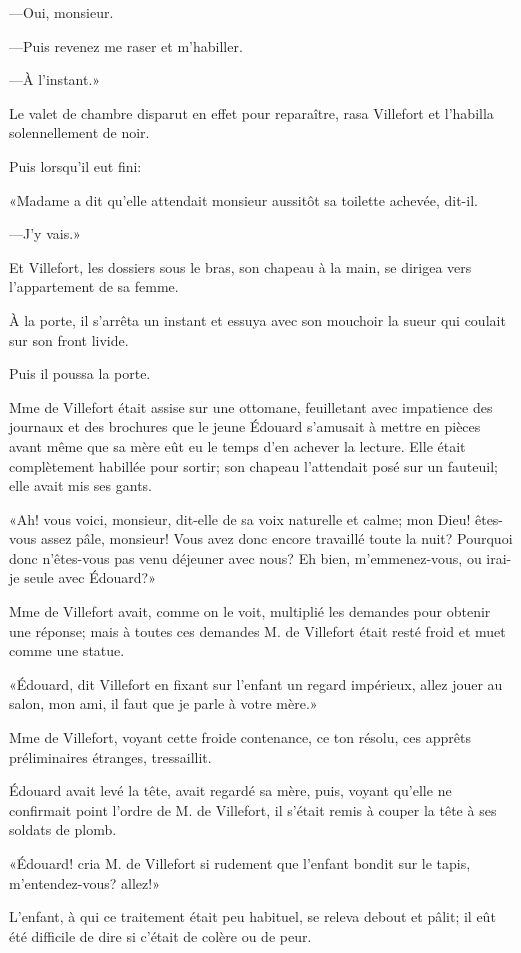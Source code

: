 —Oui, monsieur. 

—Puis revenez me raser et m'habiller. 

—À l'instant.» 

Le valet de chambre disparut en effet pour reparaître, rasa Villefort et l'habilla solennellement de noir. 

Puis lorsqu'il eut fini: 

«Madame a dit qu'elle attendait monsieur aussitôt sa toilette achevée, dit-il. 

—J'y vais.» 

Et Villefort, les dossiers sous le bras, son chapeau à la main, se dirigea vers l'appartement de sa femme. 

À la porte, il s'arrêta un instant et essuya avec son mouchoir la sueur qui coulait sur son front livide. 

Puis il poussa la porte. 

Mme de Villefort était assise sur une ottomane, feuilletant avec impatience des journaux et des brochures que le jeune Édouard s'amusait à mettre en pièces avant même que sa mère eût eu le temps d'en achever la lecture. Elle était complètement habillée pour sortir; son chapeau l'attendait posé sur un fauteuil; elle avait mis ses gants. 

«Ah! vous voici, monsieur, dit-elle de sa voix naturelle et calme; mon Dieu! êtes-vous assez pâle, monsieur! Vous avez donc encore travaillé toute la nuit? Pourquoi donc n'êtes-vous pas venu déjeuner avec nous? Eh bien, m'emmenez-vous, ou irai-je seule avec Édouard?» 

Mme de Villefort avait, comme on le voit, multiplié les demandes pour obtenir une réponse; mais à toutes ces demandes M. de Villefort était resté froid et muet comme une statue. 

«Édouard, dit Villefort en fixant sur l'enfant un regard impérieux, allez jouer au salon, mon ami, il faut que je parle à votre mère.» 

Mme de Villefort, voyant cette froide contenance, ce ton résolu, ces apprêts préliminaires étranges, tressaillit. 

Édouard avait levé la tête, avait regardé sa mère, puis, voyant qu'elle ne confirmait point l'ordre de M. de Villefort, il s'était remis à couper la tête à ses soldats de plomb. 

«Édouard! cria M. de Villefort si rudement que l'enfant bondit sur le tapis, m'entendez-vous? allez!» 

L'enfant, à qui ce traitement était peu habituel, se releva debout et pâlit; il eût été difficile de dire si c'était de colère ou de peur. 

